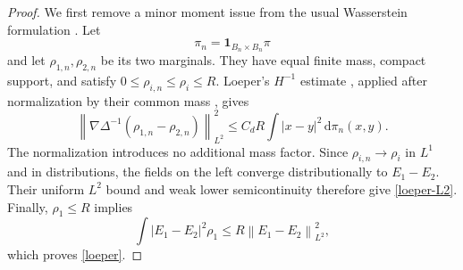 \documentclass[11pt]{article}
\newcommand{\norm}[1]{\left\lVert #1\right\rVert}
\newcommand{\abs}[1]{\left\lvert #1\right\rvert}
\newcommand{\dd}{\,\mathrm d}
\begin{document}
\begin{proof}
We first remove a minor moment issue  from the usual Wasserstein formulation .
Let
\begin{equation*}
 \pi_n=\boldsymbol 1_{B_n\times B_n}\pi
\end{equation*}
and let $\rho_{1,n},\rho_{2,n}$ be its two marginals.  They have equal finite
mass, compact support, and satisfy $0\leq\rho_{i,n}\leq\rho_i\leq R$.
 Loeper's $H^{-1}$ estimate , applied after normalization  by their common mass ,
gives
\begin{equation*}
 \norm{\nabla\Delta^{-1}(\rho_{1,n}-\rho_{2,n})}_{L^2}^2
 \leq C_dR\int\abs{x-y}^2\dd\pi_n(x,y).
\end{equation*}
The normalization introduces no additional mass factor.  Since
$\rho_{i,n}\to\rho_i$ in $L^1$ and in distributions, the fields on the
left converge distributionally to $E_1-E_2$.  Their uniform $L^2$ bound and
weak lower semicontinuity therefore give  \eqref{loeper-L2}.   Finally,
 $\rho_1\leq R$  implies
\begin{equation*}
 \int\abs{E_1-E_2}^2\rho_1
 \leq R\norm{E_1-E_2}_{L^2}^2,
\end{equation*}
which  proves \eqref{loeper}.
\end{proof}
\end{document}

